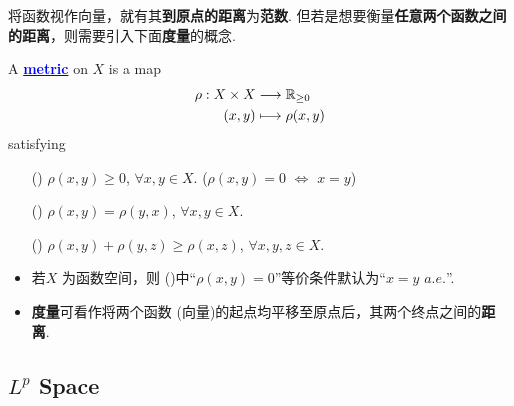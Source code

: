 	\newpage
	将函数视作向量，就有其\textbf{到原点的距离}为\textbf{范数}. 但若是想要衡量\textbf{任意两个函数之间的距离}，则需要引入下面\textbf{度量}的概念.
	\begin{defn}\label{def 1.1.2}
		A \underline{\textcolor{blue}{\textbf{metric}}} on $X$ is a map
		\begin{align}
			\rho : X \times X &\longrightarrow \mathbb{R}_{\geq 0} \\
			(x , y) &\longmapsto \rho(x , y)
		\end{align}
		satisfying
		\begin{enumerate}
			\item[(\rmnum{1})]$\rho(x,  y) \geq 0$, $\forall x , y \in X$. \hspace*{3em} ($\rho(x , y) = 0 \,\, \Leftrightarrow \,\, x = y$)
			
			\item[(\rmnum{2})]$\rho(x , y) = \rho(y , x)$, $\forall x , y \in X$.
			
			\item[(\rmnum{3})]$\rho(x , y) + \rho(y , z) \geq \rho(x , z)$, $\forall x , y , z \in X$.
		\end{enumerate}
		
		\vspace{2em}
		\begin{rmk}
			\begin{itemize}
				\item 若$X$ 为函数空间，则 ()中“$\rho(x , y) = 0$”等价条件默认为“$x = y \,\, a.e.$”.
				
				\vspace{1em}
				
				\item \textbf{度量}可看作将两个函数 (向量)的起点均平移至原点后，其两个终点之间的\textbf{距离}.
			\end{itemize}
		\end{rmk}
	\end{defn}

\vspace{4em}
\subsection{$L^p$ Space}
